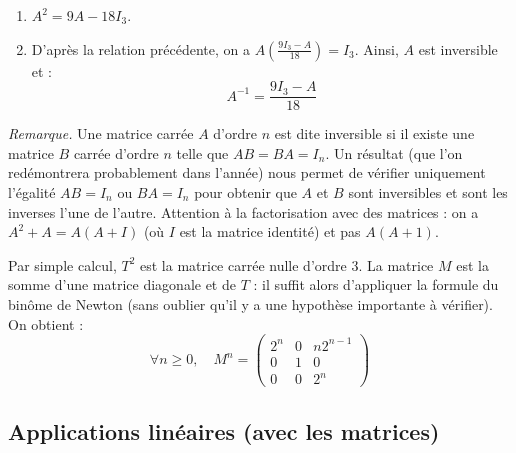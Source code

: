 \documentclass[a4paper,twoside,french,11pt]{VcCours}
\begin{document}
\begin{Exercice}{}\end{Exercice}

\begin{enumerate}
\item $A^2 = 9 A  - 18 I_3$.
\item D'après la relation précédente, on a $  A \left(\frac{9 I_3-A}{18} \right) =  I_3$. Ainsi, $A$ est inversible et :
$$ A^{-1} = \frac{9 I_3-A}{18}$$
\end{enumerate}


 
 \noindent \textit{Remarque.} Une matrice carrée $A$ d'ordre $n$ est dite inversible si il existe une matrice $B$ carrée d'ordre $n$ telle que $AB=BA= I_n$. Un résultat (que l'on redémontrera probablement dans l'année) nous permet de vérifier uniquement l'égalité $AB=I_n$ ou $BA=I_n$ pour obtenir que $A$ et $B$ sont inversibles et sont les inverses l'une de l'autre. Attention à la factorisation avec des matrices : on a $A^2+A=A(A+I)$ (où $I$ est la matrice identité) et pas $A(A+1)$.
 
 
 
 \begin{Exercice}{}\end{Exercice}Par simple calcul, $T^2$ est la matrice carrée nulle d'ordre $3$. La matrice $M$ est la somme d'une matrice diagonale et de $T$ : il suffit alors d'appliquer la formule du binôme de Newton (sans oublier qu'il y a une hypothèse importante à vérifier). On obtient :
$$ \forall n \geq 0, \quad M^n = \begin{pmatrix}
2^n & 0 & n 2^{n-1} \\
0 & 1 & 0 \\
0 & 0 & 2^n 
\end{pmatrix}$$
 


\subsection{Applications linéaires (avec les matrices)}
\end{document}
